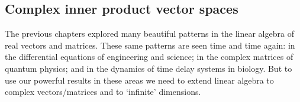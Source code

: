 \begin{draft}

\chapter{Complex inner product vector spaces}
\label{ch:cipvs}

\minitoc

The previous chapters explored many beautiful patterns in the linear algebra of real vectors and matrices.
These same patterns are seen time and time again: in the differential equations of engineering and science; in the complex matrices of quantum physics; and in the dynamics of time delay systems in biology.
But to use our powerful results in these areas we need to extend  linear algebra to complex vectors\slash matrices and to `infinite' dimensions.

\begin{comment}
Suggest not to include in a first version.

Plan to cover at a more abstract level \pooliv{Ch.6 and~7} \larsvii{Ch.5 and~8} \holti{Ch.10, \S11.4--5}:
\begin{itemize}
\item def (complex) vector space, incl functions
\item inner products and norms, incl integrals, basic orthog polys
\item generalised symmetric eigenproblem \(A\xv=\lambda B\xv\) and orthog with weighted inner product
\item linear transforms, range, kernel, with calculus applications
\item unitary matrices (poss quantum physics appl)
\item \svd: solutions and approximations
\item eigenproblem, linear independence, generalised eigenvectors, basis, change of basis, relate to FT, Hermitian matrices
\end{itemize}

Alternatively, could distribute this material as `advanced' sections at the end of various chapters.
\begin{itemize}
\item \autoref{ch:v} def (complex) vector space, incl functions
\item \autoref{ch:v} inner products and norms, incl integrals, basic orthog polys
\item \autoref{ch:eesm} generalised symmetric eigenproblem \(A\xv=\lambda B\xv\) and orthog with weighted inner product, relate to FT, Hermitian matrices
\item \autoref{ch:m}linear transforms, range, kernel, with calculus applications
\item \autoref{ch:m} unitary matrices (poss quantum physics appl)
\item \autoref{ch:m} \svd: solutions and approximations
\item \autoref{ch:gee} eigenproblem, linear independence, generalised eigenvectors, basis, change of basis
\end{itemize}

\end{comment}

\end{draft}
